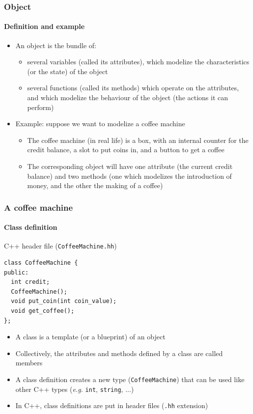 \documentclass{beamer}
\begin{document}
\begin{frame}
  \frametitle{Object}
  \framesubtitle{Definition and example}
  \begin{itemize}
  \item An \alert{object} is the bundle of:
    \begin{itemize} 
    \item several variables (called its \alert{attributes}), which modelize the characteristics (or the state) of the object
    \item several functions (called its \alert{methods}) which operate on the attributes, and which modelize the behaviour of the object (the actions it can perform)
    \end{itemize}
    \pause
  \item Example: suppose we want to modelize a coffee machine
    \begin{itemize}
    \item The coffee machine (in real life) is a box, with an internal counter for the credit balance, a slot to put coins in, and a button to get a coffee
    \item The corresponding object will have one attribute (the current credit balance) and two methods (one which modelizes the introduction of money, and the other the making of a coffee)
    \end{itemize}
  \end{itemize}
\end{frame}

\begin{frame}[fragile]
  \frametitle{A coffee machine}
  \framesubtitle{Class definition}
  \begin{block}{C++ header file (\texttt{CoffeeMachine.hh})}
    \begin{scriptsize}
\begin{verbatim}
class CoffeeMachine {
public:
  int credit;
  CoffeeMachine();
  void put_coin(int coin_value);
  void get_coffee();
};
\end{verbatim}
      \end{scriptsize}
  \end{block}
  \begin{itemize}
  \item A \alert{class} is a template (or a blueprint) of an object
  \item Collectively, the attributes and methods defined by a class are called \alert{members}
  \item A class definition creates a new \alert{type} (\texttt{CoffeeMachine}) that can be used like other C++ types (\textit{e.g.} \texttt{int}, \texttt{string}, ...)
  \item In C++, class definitions are put in header files (\texttt{.hh} extension)
  \end{itemize}
\end{frame}
\end{document}
